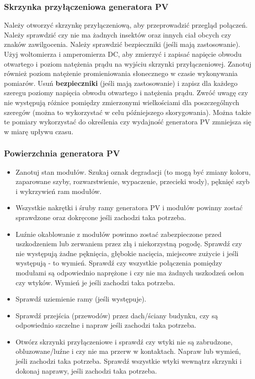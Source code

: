 \documentclass[12pt,a4paper]{article}
\begin{document}
\subsubsection{Skrzynka przyłączeniowa generatora PV }


Należy otworzyć skrzynkę przyłączeniową, aby przeprowadzić przegląd 
połączeń. Należy sprawdzić czy nie ma żadnych insektów oraz innych ciał 
obcych czy znaków zawilgocenia. Należy sprawdzić bezpieczniki (jeśli 
mają zastosowanie). Użyj woltomierza i amperomierza DC, aby zmierzyć i 
zapisać napięcie obwodu otwartego i poziom natężenia prądu na wyjściu 
skrzynki przyłączeniowej. Zanotuj również poziom natężenie 
promieniowania słonecznego w czasie wykonywania pomiarów. Usuń \textbf{bezpieczniki} (jeśli mają zastosowanie) i zapisz dla każdego szeregu 
poziomy napięcia obwodu otwartego i natężenia prądu. Zwróć 
uwagę czy nie występują różnice pomiędzy zmierzonymi wielkościami dla 
poszczególnych szeregów (można to wykorzystać w celu późniejszego 
skorygowania). Można także te pomiary wykorzystać do określenia czy 
wydajność generatora PV zmniejsza się w miarę upływu czasu. 

\subsubsection{Powierzchnia generatora PV}


\begin{itemize}
\item Zanotuj stan modułów. Szukaj oznak degradacji (to mogą być zmiany 
koloru, zaparowane szyby, rozwarstwienie, wypaczenie, przecieki wody), 
pęknięć szyb i wykrzywień ram modułów. 
\item Wszystkie nakrętki i śruby ramy generatora PV i modułów powinny 
zostać sprawdzone oraz dokręcone jeśli zachodzi taka potrzeba. 
\item Luźnie okablowanie z modułów powinno zostać zabezpieczone przed 
uszkodzeniem lub zerwaniem przez złą i niekorzystną pogodę. Sprawdź czy 
nie występują żadne pęknięcia, głębokie nacięcia, miejscowe zużycie i 
jeśli występują - to wymień. Sprawdź czy wszystkie połączenia pomiędzy 
modułami są odpowiednio naprężone i czy nie ma żadnych uszkodzeń osłon 
czy wtyków. Wymień je jeśli zachodzi taka potrzeba. 
\item Sprawdź uziemienie ramy (jeśli występuje). 
\item Sprawdź przejścia (przewodów) przez dach/ściany budynku, czy są 
odpowiednio szczelne i napraw jeśli zachodzi taka potrzeba. 
\item Otwórz skrzynki przyłączeniowe i sprawdź czy wtyki nie są 
zabrudzone, obluzowane/luźne i czy nie ma przerw w kontaktach. Napraw 
lub wymień, jeśli zachodzi taka potrzeba. Sprawdź wszystkie wtyki 
wewnątrz skrzynki i dokonaj naprawy, jeśli zachodzi taka potrzeba. 
\end{itemize}
 
\end{document}
